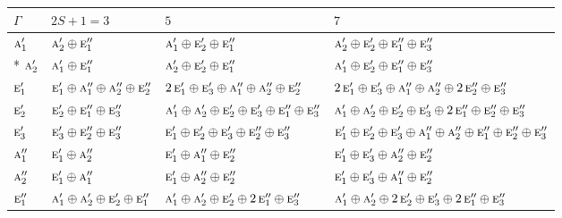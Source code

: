 \documentclass[10pt,a4paper]{article}
\numberwithin{equation}{section}
\newcommand{\irr}[1]{\text{\normalfont\scshape #1}}
\begin{document}
{\small\setlength{\tabcolsep}{3pt}\begin{longtable}{@{}l>{\RaggedRight\arraybackslash}p{}>{\RaggedRight\arraybackslash}p{}>{\RaggedRight\arraybackslash}p{}@{}}\toprule
$\Gamma$ & $2S + 1 = 3$ & $5$ & $7$\\\midrule\endhead
\bottomrule\endfoot\endlastfoot
$\irr{a}_{1}'$ & $\irr{a}_{2}'\oplus \irr{e}_{1}''$ & $\irr{a}_{1}'\oplus \irr{e}_{2}'\oplus \irr{e}_{1}''$ & $\irr{a}_{2}'\oplus \irr{e}_{2}'\oplus \irr{e}_{1}''\oplus \irr{e}_{3}''$\\*
$\irr{a}_{2}'$ & $\irr{a}_{1}'\oplus \irr{e}_{1}''$ & $\irr{a}_{2}'\oplus \irr{e}_{2}'\oplus \irr{e}_{1}''$ & $\irr{a}_{1}'\oplus \irr{e}_{2}'\oplus \irr{e}_{1}''\oplus \irr{e}_{3}''$\\
$\irr{e}_{1}'$ & $\irr{e}_{1}'\oplus \irr{a}_{1}''\oplus \irr{a}_{2}''\oplus \irr{e}_{2}''$ & $2\,\irr{e}_{1}'\oplus \irr{e}_{3}'\oplus \irr{a}_{1}''\oplus \irr{a}_{2}''\oplus \irr{e}_{2}''$ & $2\,\irr{e}_{1}'\oplus \irr{e}_{3}'\oplus \irr{a}_{1}''\oplus \irr{a}_{2}''\oplus 2\,\irr{e}_{2}''\oplus \irr{e}_{3}''$\\
$\irr{e}_{2}'$ & $\irr{e}_{2}'\oplus \irr{e}_{1}''\oplus \irr{e}_{3}''$ & $\irr{a}_{1}'\oplus \irr{a}_{2}'\oplus \irr{e}_{2}'\oplus \irr{e}_{3}'\oplus \irr{e}_{1}''\oplus \irr{e}_{3}''$ & $\irr{a}_{1}'\oplus \irr{a}_{2}'\oplus \irr{e}_{2}'\oplus \irr{e}_{3}'\oplus 2\,\irr{e}_{1}''\oplus \irr{e}_{2}''\oplus \irr{e}_{3}''$\\
$\irr{e}_{3}'$ & $\irr{e}_{3}'\oplus \irr{e}_{2}''\oplus \irr{e}_{3}''$ & $\irr{e}_{1}'\oplus \irr{e}_{2}'\oplus \irr{e}_{3}'\oplus \irr{e}_{2}''\oplus \irr{e}_{3}''$ & $\irr{e}_{1}'\oplus \irr{e}_{2}'\oplus \irr{e}_{3}'\oplus \irr{a}_{1}''\oplus \irr{a}_{2}''\oplus \irr{e}_{1}''\oplus \irr{e}_{2}''\oplus \irr{e}_{3}''$\\
$\irr{a}_{1}''$ & $\irr{e}_{1}'\oplus \irr{a}_{2}''$ & $\irr{e}_{1}'\oplus \irr{a}_{1}''\oplus \irr{e}_{2}''$ & $\irr{e}_{1}'\oplus \irr{e}_{3}'\oplus \irr{a}_{2}''\oplus \irr{e}_{2}''$\\
$\irr{a}_{2}''$ & $\irr{e}_{1}'\oplus \irr{a}_{1}''$ & $\irr{e}_{1}'\oplus \irr{a}_{2}''\oplus \irr{e}_{2}''$ & $\irr{e}_{1}'\oplus \irr{e}_{3}'\oplus \irr{a}_{1}''\oplus \irr{e}_{2}''$\\
$\irr{e}_{1}''$ & $\irr{a}_{1}'\oplus \irr{a}_{2}'\oplus \irr{e}_{2}'\oplus \irr{e}_{1}''$ & $\irr{a}_{1}'\oplus \irr{a}_{2}'\oplus \irr{e}_{2}'\oplus 2\,\irr{e}_{1}''\oplus \irr{e}_{3}''$ & $\irr{a}_{1}'\oplus \irr{a}_{2}'\oplus 2\,\irr{e}_{2}'\oplus \irr{e}_{3}'\oplus 2\,\irr{e}_{1}''\oplus \irr{e}_{3}''$\\

\end{longtable}}
\end{document}
